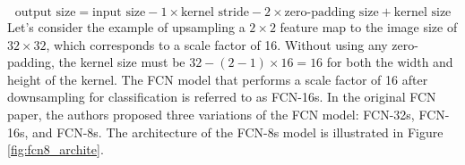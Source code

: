 % 
%
$$\text{output size} = \text{input size} - 1 \times \text{kernel stride} - 2 \times \text{zero-padding size} + \text{kernel size}$$
Let's consider the example of upsampling a $2 \times 2$ feature map to the image size of $32 \times 32$, which corresponds to a scale factor of 16. Without using any zero-padding, the kernel size must be $32 - (2-1) \times 16 = 16$ for both the width and height of the kernel. The FCN model that performs a scale factor of 16 after downsampling for classification is referred to as FCN-16s. In the original FCN paper, the authors proposed three variations of the FCN model: FCN-32s, FCN-16s, and FCN-8s. The architecture of the FCN-8s model is illustrated in Figure \ref{fig:fcn8_archite}.

